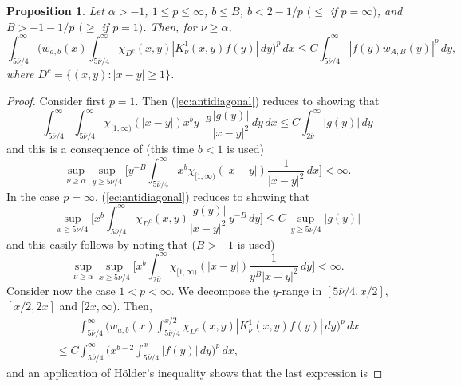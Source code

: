 \documentclass[leqno,a4paper]{amsart}
\newtheorem{Prop}{Proposition}
\newcommand{\overnu}{\overline{\nu}}
\begin{document}
\begin{Prop}
\label{Prop:P2}
Let $\alpha>-1$, $1\le p\le\infty$, $b\le B$, $b<2-1/p$ $(\le$ if $p=\infty)$,
and $B>-1-1/p$ $(\ge$ if $p=1)$. Then,
for $\nu\ge \alpha$,
\begin{equation}
\label{ec:antidiagonal} \int_{5\overnu/4}^{\infty}
\bigg(w_{a,b}(x) \int_{5\overnu/4}^{\infty}
\chi_{D^c}(x,y)|K_\nu^{1}(x,y)f(y)|\,dy \bigg)^p\,dx \le
C\int_{5\overnu/4}^{\infty}
\left|f(y)w_{A,B}(y)\right|^p\,dy,
\end{equation}
where $D^c=\{(x,y): |x-y|\ge 1\}$.
\end{Prop}

\begin{proof}
Consider first $p=1$. Then (\ref{ec:antidiagonal}) reduces to showing that
\begin{equation*}
\int_{5\overnu/4}^{\infty}
\int_{5\overnu/4}^{\infty}\chi_{[1,\infty)}
(|x-y|)x^by^{-B}\frac{|g(y)|}{|x-y|^2}\,dy\,dx
\le C\int_{2\overnu}^{\infty}|g(y)|\,dy
\end{equation*}
and this is a consequence of (this time $b<1$ is used)
\begin{equation*}
\sup_{\nu\ge\alpha}\sup_{y\ge5\overnu/4}\bigg[y^{-B}
\int_{5\overnu/4}^{\infty}x^b\chi_{[1,\infty)}
(|x-y|)\frac{1}{|x-y|^2}\,dx\bigg] < \infty.
\end{equation*}
In the case $p=\infty$, (\ref{ec:antidiagonal}) reduces to
showing that
\begin{equation*}
\sup_{x\ge5\overnu/4}
\bigg[x^b\int_{5\overnu/4}^{\infty}\chi_{D^c}(x,y)\frac{|g(y)|}
{|x-y|^2}\,y^{-B}\,dy\bigg] \le C\,\sup_{y\ge5\overnu/4}|g(y)|
\end{equation*}
and this easily follows by noting that ($B>-1$ is used)
\begin{equation*}
\sup_{\overnu\ge\alpha}\sup_{x\ge5\overnu/4}
\bigg[x^b\int_{2\overnu}^{\infty}
\chi_{[1,\infty)}(|x-y|)\frac{1}{y^B|x-y|^2}\,dy\bigg]<\infty.
\end{equation*}
Consider now the case $1<p<\infty$. We decompose the $y$-range in
$[5\overnu/4, x/2]$, $[x/2,2x]$ and $[2x,\infty)$. Then,
\begin{multline*}
\qquad
\int_{5\overnu/4}^{\infty} \bigg(w_{a,b}(x)
\int_{5\overnu/4}^{x/2}
\chi_{D^c}(x,y) |K_\nu^1(x,y)f(y)|\,dy\bigg)^p\,dx\\
\le C\int_{5\overnu/4}^\infty \bigg(x^{b-2}
\int_{5\overnu/4}^{x}|f(y)|\,dy\bigg)^p\,dx,
\qquad
\end{multline*}
and an application of H\"older's inequality shows that the last expression is

\end{proof}
\end{document}
